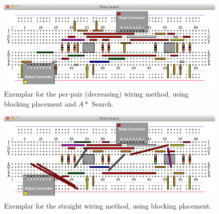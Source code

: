 \begin{figure}[H]
\begin{center}
\includegraphics[width=\textwidth]{Images/exemplar_per_pair_decreasing.png}
\caption[Per-pair (decreasing) method exemplar]{Exemplar for the per-pair
(decreasing) wiring method, using blocking placement and $A*$ Search.}
\end{center}
\end{figure}

\begin{figure}[H]
\begin{center}
\includegraphics[width=\textwidth]{Images/exemplar_straight_wiring.png}
\caption[Straight wiring exemplar]{Exemplar for the straight wiring method,
using blocking placement.}
\end{center}
\end{figure}

